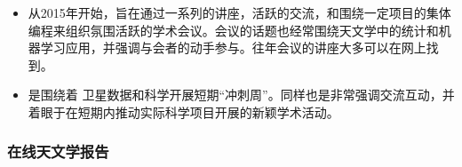 \documentclass[letterpaper,10pt,english]{sphinxmanual}
\begin{document}
\begin{itemize}
\begin{itemize}
\item {} 
从2015年开始，旨在通过一系列的讲座，活跃的交流，和围绕一定项目的集体编程来组织氛围活跃的学术会议。会议的话题也经常围绕天文学中的统计和机器学习应用，并强调与会者的动手参与。往年会议的讲座大多可以在网上找到。

\item {} 
 是围绕着 
卫星数据和科学开展短期“冲刺周”。同样也是非常强调交流互动，并着眼于在短期内推动实际科学项目开展的新颖学术活动。

\end{itemize}

\end{itemize}


\subsubsection{在线天文学报告}
\end{document}

